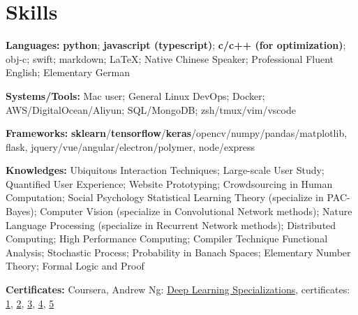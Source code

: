 \section{\textbf{Skills}}
\resumeSubHeadingListStart
\item{
  \textbf{Languages:}{ \textbf{python}; \textbf{javascript (typescript)}; \textbf{c/c++ (for optimization)}; obj-c; swift; markdown; \LaTeX; Native Chinese Speaker; Professional Fluent English; Elementary German}
}
\item{
 \textbf{Systems/Tools:}{ Mac user; General Linux DevOps; Docker; AWS/DigitalOcean/Aliyun; SQL/MongoDB; zsh/tmux/vim/vscode}
}
\item{
 \textbf{Frameworks:}{ \textbf{sklearn}/\textbf{tensorflow}/\textbf{keras}/opencv/numpy/pandas/matplotlib, flask, jquery/vue/angular/electron/polymer, node/express}
}
\item{
  \textbf{Knowledges:}{ 
    \resumeItemListStart
       { Ubiquitous Interaction Techniques; Large-scale User Study; Quantified User Experience; Website Prototyping; Crowdsourcing in Human Computation; Social Psychology}
       { Statistical Learning Theory (specialize in PAC-Bayes); Computer Vision (specialize in Convolutional Network methods); Nature Language Processing (specialize in Recurrent Network methods); Distributed Computing; High Performance Computing; Compiler Technique}
       { Functional Analysis; Stochastic Process; Probability in Banach Spaces; Elementary Number Theory; Formal Logic and Proof}
   \resumeItemListEnd
  }
}
\item{
 \textbf{Certificates:}{
  Coursera, Andrew Ng: \href{https://www.coursera.org/account/accomplishments/specialization/QGH8ZVJ6J2L2}{Deep Learning Specializations}, certificates:
  \href{https://www.coursera.org/account/accomplishments/verify/YH4NT7HHN263}{1}, 
  \href{https://www.coursera.org/account/accomplishments/verify/QGH3GNGF6BM4}{2}, 
  \href{https://www.coursera.org/account/accomplishments/verify/6VU45R2SZEF6}{3},
  \href{https://www.coursera.org/account/accomplishments/verify/LF3K9BQQDLVL}{4},
  \href{https://www.coursera.org/account/accomplishments/verify/JQFLW2DPYAGW}{5}
 }
}
\resumeSubHeadingListEnd